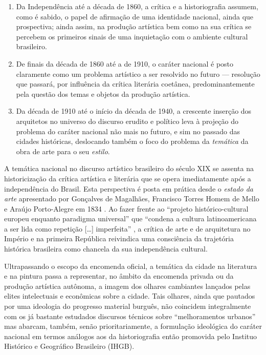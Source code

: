 \begin{enumerate}
\def\labelenumi{(\arabic{enumi})}
\tightlist
\item
  Da Independência até a década de 1860, a crítica e a historiografia
  assumem, como é sabido, o papel de afirmação de uma identidade
  nacional, ainda que prospectiva; ainda assim, na produção artística
  bem como na sua crítica se percebem os primeiros sinais de uma
  inquietação com o ambiente cultural brasileiro.
\item
  De finais da década de 1860 até a de 1910, o caráter nacional é posto
  claramente como um problema artístico a ser resolvido no futuro ---
  resolução que passará, por influência da crítica literária coetânea,
  predominantemente pela questão dos temas e objetos da produção
  artística.
\item
  Da década de 1910 até o início da década de 1940, a crescente inserção
  dos arquitetos no universo do discurso erudito e político leva à
  projeção do problema do caráter nacional não mais no futuro, e sim no
  passado das cidades históricas, deslocando também o foco do problema
  da \emph{temática} da obra de arte para o seu \emph{estilo}.
\end{enumerate}

A temática nacional no discurso artístico brasileiro do século XIX se
assenta na historicização da crítica artística e literária que se opera
imediatamente após a independência do Brasil. Esta perspectiva é posta
em prática desde o \emph{estado da arte} apresentado por Gonçalves de
Magalhães, Francisco Torres Homem de Mello e Araújo Porto-Alegre em 1834
\autocite{magalhaes:1834resume}. Ao fazer frente ao ``projeto
histórico-cultural europeu enquanto paradigma universal'' que ``condena
a cultura latinoamericana a ser lida como repetição {[}\ldots{]}
imperfeita'' \autocite[p.~360--361]{dallemand:1996urban15}, a crítica de
arte e de arquitetura no Império e na primeira República reivindica uma
consciência da trajetória histórica brasileira como chancela da sua
independência cultural.

Ultrapassando o escopo da encomenda oficial, a temática da cidade na
literatura e na pintura passa a representar, no âmbito da encomenda
privada ou da produção artística autônoma, a imagem dos olhares
cambiantes lançados pelas elites intelectuais e econômicas sobre a
cidade. Tais olhares, ainda que pautados por uma ideologia do progresso
material burguês, não coincidem integralmente com os já bastante
estudados discursos técnicos sobre ``melhoramentos urbanos''
\autocite{salgueiro:2001cidades} mas abarcam, também, senão
prioritariamente, a formulação ideológica do caráter nacional em termos
análogos aos da historiografia então promovida pelo Instituo Histórico e
Geográfico Brasileiro (IHGB).

